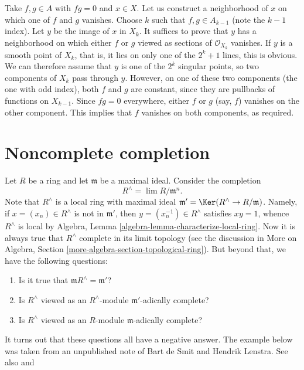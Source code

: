 \medskip\noindent
Take $f, g \in A$ with $fg = 0$ and $x \in X$. Let us construct a
neighborhood of $x$ on which one of $f$ and $g$ vanishes. Choose $k$
such that $f, g \in A_{k - 1}$ (note the $k - 1$ index).
Let $y$ be the image of $x$ in $X_k$. It suffices to prove that $y$ has
a neighborhood on which either $f$ or $g$ viewed as sections of
$\mathcal{O}_{X_k}$ vanishes.
If $y$ is a smooth point of $X_k$, that is, it lies on only one of the
$2^k + 1$ lines, this is obvious. We can therefore assume that $y$ is one
of the $2^k$ singular points, so two components of $X_k$ pass through
$y$. However, on one of these two components (the one with odd index),
both $f$ and $g$ are constant, since they are pullbacks of functions on
$X_{k - 1}$. Since $fg = 0$ everywhere, either $f$ or $g$ (say, $f$)
vanishes on the other component.
This implies that $f$ vanishes on both components, as required.






\section{Noncomplete completion}
\label{section-noncomplete-completion}

\noindent
Let $R$ be a ring and let $\mathfrak m$ be a maximal ideal. Consider the
completion
$$
R^\wedge = \lim R/\mathfrak m^n.
$$
Note that $R^\wedge$ is a local ring with maximal ideal
$\mathfrak m' = \Ker(R^\wedge \to R/\mathfrak m)$.
Namely, if $x = (x_n) \in R^\wedge$ is not in $\mathfrak m'$, then
$y = (x_n^{-1}) \in R^\wedge$ satisfies $xy = 1$, whence $R^\wedge$ is local by
Algebra, Lemma \ref{algebra-lemma-characterize-local-ring}. Now it is
always true that $R^\wedge$ complete in its limit topology (see the
discussion in
More on Algebra, Section \ref{more-algebra-section-topological-ring}).
But beyond that, we have the following questions:
\begin{enumerate}
\item Is it true that $\mathfrak m R^\wedge = \mathfrak m'$?
\item Is $R^\wedge$ viewed as an $R^\wedge$-module $\mathfrak m'$-adically
complete?
\item Is $R^\wedge$ viewed as an $R$-module $\mathfrak m$-adically complete?
\end{enumerate}
It turns out that these questions all have a negative answer.
The example below was taken from an unpublished note of
Bart de Smit and Hendrik Lenstra. See also
\cite[Exercise III.2.12]{Bourbaki-CA} and
\cite[Example 1.8]{Yekutieli}

